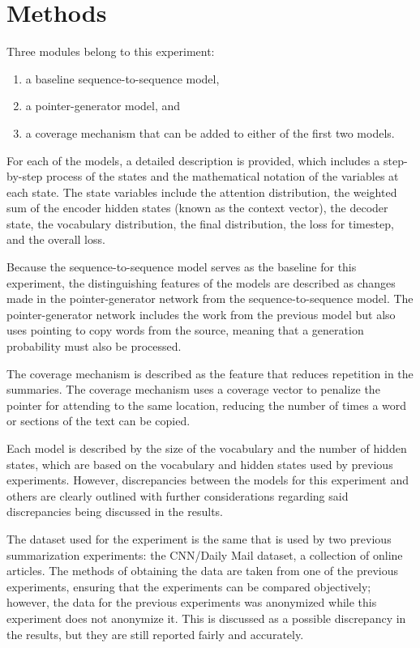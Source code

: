 \documentclass[11pt]{article}
\begin{document}
\section{Methods}

Three modules belong to this experiment:

\begin{enumerate}
\item a baseline sequence-to-sequence model, 
\item a pointer-generator model, and 
\item a coverage mechanism that can be added to either of the first two models.
\end{enumerate}

For each of the models, a detailed description is provided, which includes a step-by-step process of the states and the mathematical notation of the variables at each state. The state variables include the attention distribution, the weighted sum of the encoder hidden states (known as the context vector), the decoder state, the vocabulary distribution, the final distribution, the loss for timestep, and the overall loss. 

Because the sequence-to-sequence model serves as the baseline for this experiment, the distinguishing features of the models are described as changes made in the pointer-generator network from the sequence-to-sequence model. The pointer-generator network includes the work from the previous model but also uses pointing to copy words from the source, meaning that a generation probability must also be processed.

The coverage mechanism is described as the feature that reduces repetition in the summaries. The coverage mechanism uses a coverage vector to penalize the pointer for attending to the same location, reducing the number of times a word or sections of the text can be copied. 

Each model is described by the size of the vocabulary and the number of hidden states, which are based on the vocabulary and hidden states used by previous experiments. However, discrepancies between the models for this experiment and others are clearly outlined with further considerations regarding said discrepancies being discussed in the results. 

The dataset used for the experiment is the same that is used by two previous summarization experiments: the CNN/Daily Mail dataset, a collection of online articles. The methods of obtaining the data are taken from one of the previous experiments, ensuring that the experiments can be compared objectively; however, the data for the previous experiments was anonymized while this experiment does not anonymize it. This is discussed as a possible discrepancy in the results, but they are still reported fairly and accurately. 
\end{document}
